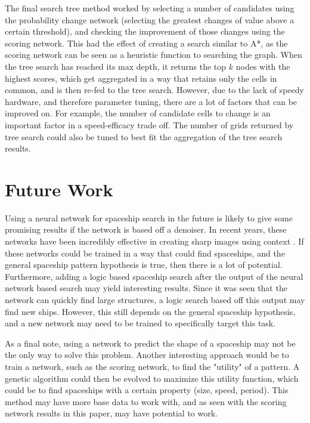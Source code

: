 \documentclass{l4proj}
\begin{document}
The final search tree method worked by selecting a number of candidates using the probability change network (selecting the greatest changes of value above a certain threshold), and checking the improvement of those changes using the scoring network. This had the effect of creating a search similar to A*, as the scoring network can be seen as a heuristic function to searching the graph. When the tree search has reached its max depth, it returns the top $k$ nodes with the highest scores, which get aggregated in a way that retains only the cells in common, and is then re-fed to the tree search. However, due to the lack of speedy hardware, and therefore parameter tuning, there are a lot of factors that can be improved on. For example, the number of candidate cells to change is an important factor in a speed-efficacy trade off. The number of grids returned by tree search could also be tuned to best fit the aggregation of the tree search results.


\section{Future Work}

Using a neural network for spaceship search in the future is likely to give some promising results if the network is based off a denoiser. In recent years, these networks have been incredibly effective in creating sharp images using context \cite{Zamir_2022_CVPR}. If these networks could be trained in a way that could find spaceships, and the general spaceship pattern hypothesis is true, then there is a lot of potential. Furthermore, adding a logic based spaceship search after the output of the neural network based search may yield interesting results. Since it was seen that the network can quickly find large structures, a logic search based off this output may find new ships. However, this still depends on the general spaceship hypothesis, and a new network may need to be trained to specifically target this task.

As a final note, using a network to predict the shape of a spaceship may not be the only way to solve this problem. Another interesting approach would be to train a network, such as the scoring network, to find the "utility" of a pattern. A genetic algorithm could then be evolved to maximize this utility function, which could be to find spaceships with a certain property (size, speed, period). This method may have more base data to work with, and as seen with the scoring network results in this paper, may have potential to work.
\end{document}
